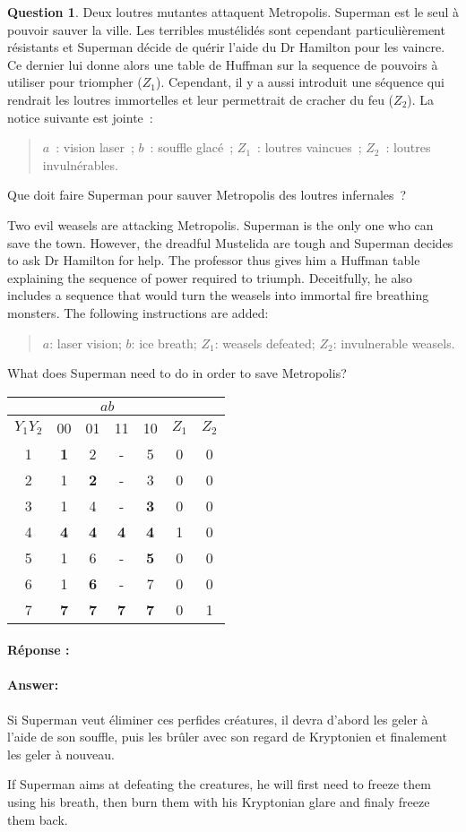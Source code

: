 \documentclass[11pt,a4paper,dvipsnames]{article}
\theoremstyle{definition}%
\newtheorem{Q}{Question}[] %
\newcommand{\reponse}[1]{%
	\ifthenelse {\boolean{corrige}} {\fr{\paragraph{Réponse :}}\en{\paragraph{Answer:}} \color{darkblue}   #1\color{black}} {}
 }
\newcommand{\fr}[1]{
 	\ifthenelse {\boolean{fr}} {#1} {}
 }
\newcommand{\en}[1]{
 	\ifthenelse {\boolean{en}} {#1} {}
 }
\begin{document}
\begin{Q}
	\fr{Deux loutres mutantes attaquent Metropolis.
	Superman est le seul à pouvoir sauver la ville.
	Les terribles mustélidés sont cependant particulièrement résistants et Superman décide de quérir l'aide du Dr Hamilton pour les vaincre.
	Ce dernier lui donne alors une table de Huffman sur la sequence de pouvoirs à utiliser pour triompher ($Z_1$).
	Cependant, il y a aussi introduit une séquence qui rendrait les loutres immortelles et leur permettrait de cracher du feu ($Z_2$).
	La notice suivante est jointe~:
	\begin{verse}
		$a$~: vision laser~; $b$~: souffle glacé~; $Z_1$~: loutres vaincues~; $Z_2$~: loutres invulnérables.
	\end{verse}

	Que doit faire Superman pour sauver Metropolis des loutres infernales~?}

	\en{Two evil weasels are attacking Metropolis.
	Superman is the only one who can save the town.
	However, the dreadful Mustelida are tough and Superman decides to ask Dr Hamilton for help.
	The professor thus gives him a Huffman table explaining the sequence of power required to triumph.
	Deceitfully, he also includes a sequence that would turn the weasels into immortal fire breathing monsters.
	The following instructions are added:
	\begin{verse}
		$a$: laser vision; $b$: ice breath; $Z_1$: weasels defeated; $Z_2$: invulnerable weasels.
	\end{verse}

	What does Superman need to do in order to save Metropolis?}

	\begin{center}
		\begin{tabular}{|c|c|c|c|c|c|c|} \hline
			& \multicolumn{4}{c|}{$ab$} & & \\ \hline
			$Y_1Y_2$& 00 & 01 & 11 & 10 & $Z_1$ & $Z_2$\\ \hline
			1 & \textbf{1} & 2 & - & 5 & 0 & 0 \\ \hline
			2 & 1 & \textbf{2} & - & 3 & 0 & 0 \\ \hline
			3 & 1 & 4 & - & \textbf{3} & 0 & 0 \\ \hline
			4 & \textbf{4} & \textbf{4} & \textbf{4} & \textbf{4} & 1 & 0 \\ \hline
			5 & 1 & 6 & - & \textbf{5} & 0 & 0\\ \hline
			6 & 1 & \textbf{6} & - & 7 & 0 & 0 \\ \hline
			7 & \textbf{7} & \textbf{7} & \textbf{7} & \textbf{7} & 0 & 1 \\ \hline
		\end{tabular}
	\end{center}

	\reponse{
		\fr{Si Superman veut éliminer ces perfides créatures, il devra d'abord les geler à l'aide de son souffle, puis les brûler avec son regard de Kryptonien et finalement les geler à nouveau.}
		\en{If Superman aims at defeating the creatures, he will first need to freeze them using his breath, then burn them with his Kryptonian glare and finaly freeze them back.}
	}
\end{Q}
\end{document}
